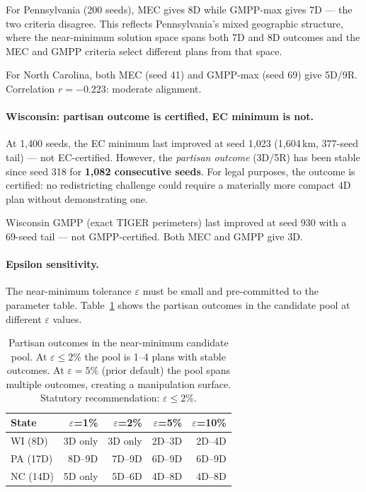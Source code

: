 For Pennsylvania (200 seeds), MEC gives 8D while GMPP-max gives 7D --- the
two criteria disagree. This reflects Pennsylvania's mixed geographic structure,
where the near-minimum solution space spans both 7D and 8D outcomes and the
MEC and GMPP criteria select different plans from that space.

For North Carolina, both MEC (seed 41) and GMPP-max (seed 69) give 5D/9R.
Correlation $r = -0.223$: moderate alignment.

\paragraph{Wisconsin: partisan outcome is certified, EC minimum is not.}
At 1{,}400 seeds, the EC minimum last improved at seed 1{,}023 (1{,}604\,km,
377-seed tail) --- not EC-certified. However, the \emph{partisan outcome}
(3D/5R) has been stable since seed 318 for \textbf{1{,}082 consecutive seeds}.
For legal purposes, the outcome is certified: no redistricting challenge could
require a materially more compact 4D plan without demonstrating one.

Wisconsin GMPP (exact TIGER perimeters) last improved at seed 930 with a
69-seed tail --- not GMPP-certified. Both MEC and GMPP give 3D.

\paragraph{Epsilon sensitivity.}
The near-minimum tolerance $\varepsilon$ must be small and pre-committed to
the parameter table. Table~\ref{tab:epsilon} shows the partisan outcomes in
the candidate pool at different $\varepsilon$ values.

\begin{table}[h]
\centering
\small
\begin{tabular}{lrrrr}
\toprule
State & $\varepsilon$=1\% & $\varepsilon$=2\% & $\varepsilon$=5\% & $\varepsilon$=10\% \\
\midrule
WI (8D)  & 3D only & 3D only & 2D--3D & 2D--4D \\
PA (17D) & 8D--9D  & 7D--9D  & 6D--9D & 6D--9D \\
NC (14D) & 5D only & 5D--6D  & 4D--8D & 4D--8D \\
\bottomrule
\end{tabular}
\caption{Partisan outcomes in the near-minimum candidate pool. At
  $\varepsilon \leq 2\%$ the pool is 1--4 plans with stable outcomes.
  At $\varepsilon = 5\%$ (prior default) the pool spans multiple outcomes,
  creating a manipulation surface. Statutory recommendation: $\varepsilon \leq 2\%$.}
\label{tab:epsilon}
\end{table}

